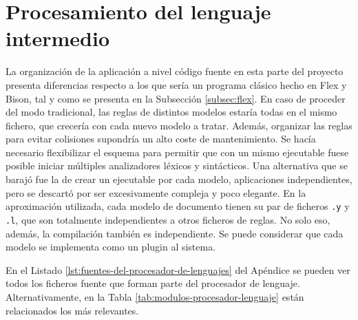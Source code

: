 \section{Procesamiento del lenguaje intermedio}

La organización de la aplicación a nivel código fuente en esta parte del proyecto presenta diferencias respecto a los que sería un programa clásico hecho en Flex y Bison, tal y como se presenta en la Subsección \ref{subsec:flex}. En caso de proceder del modo tradicional, las reglas de distintos modelos estaría todas en el mismo fichero, que crecería con cada nuevo modelo a tratar. Además, organizar las reglas para evitar colisiones supondría un alto coste de mantenimiento. Se hacía necesario flexibilizar el esquema  para permitir que con un mismo ejecutable fuese posible iniciar múltiples analizadores léxicos y sintácticos. Una alternativa que se barajó fue la de crear un ejecutable por cada modelo, aplicaciones independientes, pero se descartó por ser excesivamente compleja y poco elegante. En la aproximación utilizada, cada modelo de documento tienen su par de ficheros \verb|.y| y \verb|.l|, que son totalmente independientes a otros ficheros de reglas. No solo eso, además, la compilación también es independiente. Se puede considerar que cada modelo se implementa como un plugin al sistema.

En el Listado \ref{lst:fuentes-del-procesador-de-lenguajes} del Apéndice se pueden ver todos los ficheros fuente que forman parte del procesador de lenguaje. Alternativamente, en la Tabla \ref{tab:modulos-procesador-lenguaje} están relacionados los más relevantes.

